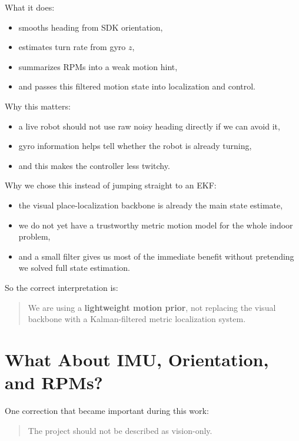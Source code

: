 \documentclass[11pt,a4paper]{article}
\begin{document}
What it does:

\begin{itemize}[nosep]
  \item smooths heading from SDK orientation,
  \item estimates turn rate from gyro $z$,
  \item summarizes RPMs into a weak motion hint,
  \item and passes this filtered motion state into localization and control.
\end{itemize}

Why this matters:

\begin{itemize}[nosep]
  \item a live robot should not use raw noisy heading directly if we can avoid
        it,
  \item gyro information helps tell whether the robot is already turning,
  \item and this makes the controller less twitchy.
\end{itemize}

Why we chose this instead of jumping straight to an EKF:

\begin{itemize}[nosep]
  \item the visual place-localization backbone is already the main state
        estimate,
  \item we do not yet have a trustworthy metric motion model for the whole
        indoor problem,
  \item and a small filter gives us most of the immediate benefit without
        pretending we solved full state estimation.
\end{itemize}

So the correct interpretation is:

\begin{quote}
We are using a \textbf{lightweight motion prior}, not replacing the visual
backbone with a Kalman-filtered metric localization system.
\end{quote}


\section{What About IMU, Orientation, and RPMs?}

One correction that became important during this work:

\begin{quote}
The project should not be described as vision-only.
\end{quote}
\end{document}
